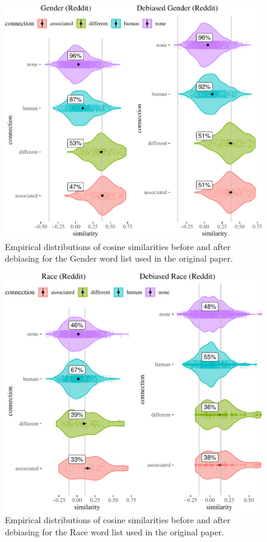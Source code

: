 \documentclass{clv3}
\begin{document}
\begin{figure}

\begin{center}\includegraphics[width=0.95\linewidth]{figures/figdebiasedCosine22c} \end{center}
\caption{Empirical distributions of cosine similarities before and after  debiasing for  the Gender word list used in  the original paper.}
\label{fig:empiricalDebiased2}
\end{figure}

\begin{figure}

\begin{center}\includegraphics[width=0.95\linewidth]{figures/figdebiasedCosine23c} \end{center}
\caption{Empirical distributions of cosine similarities before and after  debiasing for the Race word list used in  the original paper.}
\label{fig:empiricalDebiased3}
\end{figure}
\end{document}
